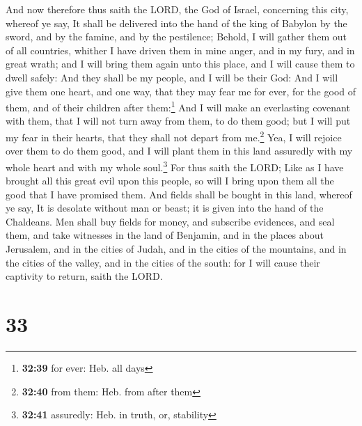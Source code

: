  And now therefore thus saith the LORD, the God of
Israel, concerning this city, whereof ye say, It shall be delivered into
the hand of the king of Babylon by the sword, and by the famine, and by
the pestilence;  Behold, I will gather them out of all
countries, whither I have driven them in mine anger, and in my fury, and
in great wrath; and I will bring them again unto this place, and I will
cause them to dwell safely:  And they shall be my people,
and I will be their God:  And I will give them one heart,
and one way, that they may fear me for ever, for the good of them, and
of their children after them:\footnote{\textbf{32:39} for ever: Heb. all
  days}  And I will make an everlasting covenant with
them, that I will not turn away from them, to do them good; but I will
put my fear in their hearts, that they shall not depart from
me.\footnote{\textbf{32:40} from them: Heb. from after them}
 Yea, I will rejoice over them to do them good, and I
will plant them in this land assuredly with my whole heart and with my
whole soul.\footnote{\textbf{32:41} assuredly: Heb. in truth, or,
  stability}  For thus saith the LORD; Like as I have
brought all this great evil upon this people, so will I bring upon them
all the good that I have promised them.  And fields shall
be bought in this land, whereof ye say, It is desolate without man or
beast; it is given into the hand of the Chaldeans.  Men
shall buy fields for money, and subscribe evidences, and seal them, and
take witnesses in the land of Benjamin, and in the places about
Jerusalem, and in the cities of Judah, and in the cities of the
mountains, and in the cities of the valley, and in the cities of the
south: for I will cause their captivity to return, saith the LORD.

\hypertarget{section-32}{%
\section{33}\label{section-32}}

